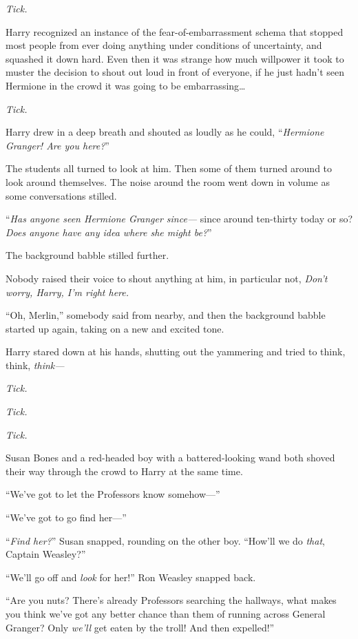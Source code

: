 \emph{Tick.}

Harry recognized an instance of the fear-of-embarrassment schema that stopped most people from ever doing anything under conditions of uncertainty, and squashed it down hard. Even then it was strange how much willpower it took to muster the decision to shout out loud in front of everyone, if he just hadn’t seen Hermione in the crowd it was going to be embarrassing…

\emph{Tick.}

Harry drew in a deep breath and shouted as loudly as he could, “\emph{Hermione Granger! Are you here?}”

The students all turned to look at him. Then some of them turned around to look around themselves. The noise around the room went down in volume as some conversations stilled.

“\emph{Has anyone seen Hermione Granger since—} since around ten-thirty today or so? \emph{Does anyone have any idea where she might be?}”

The background babble stilled further.

Nobody raised their voice to shout anything at him, in particular not, \emph{Don’t worry, Harry, I’m right here.}

“Oh, Merlin,” somebody said from nearby, and then the background babble started up again, taking on a new and excited tone.

Harry stared down at his hands, shutting out the yammering and tried to think, think, \emph{think—}

\emph{Tick.}

\emph{Tick.}

\emph{Tick.}

Susan Bones and a red-headed boy with a battered-looking wand both shoved their way through the crowd to Harry at the same time.

“We’ve got to let the Professors know somehow—”

“We’ve got to go find her—”

“\emph{Find her?}” Susan snapped, rounding on the other boy. “How’ll we do \emph{that}, Captain Weasley?”

“We’ll go off and \emph{look} for her!” Ron Weasley snapped back.

“Are you nuts? There’s already Professors searching the hallways, what makes you think we’ve got any better chance than them of running across General Granger? Only \emph{we’ll} get eaten by the troll! And then expelled!”

